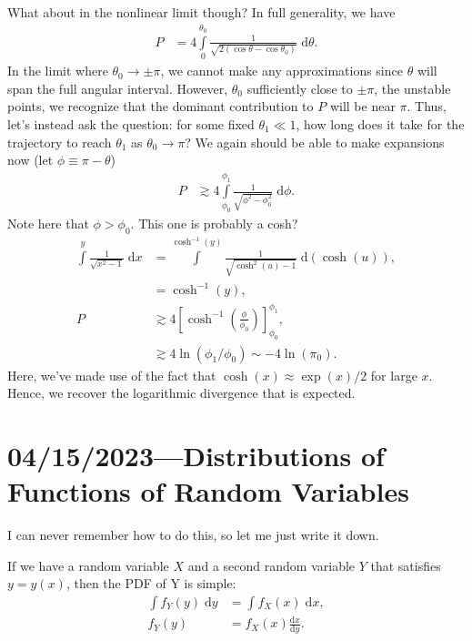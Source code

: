 \documentclass[12pt]{article}
\newcommand*{\rd}[2]{\frac{\mathrm{d}#1}{\mathrm{d}#2}}
\newcommand*{\p}[1]{\left(#1\right)}
\newcommand*{\s}[1]{\left[#1\right]}
\begin{document}
What about in the nonlinear limit though? In full generality, we have
\begin{align*}
    P &= 4\int\limits_0^{\theta_0}
        \frac{1}{\sqrt{2\p{\cos \theta - \cos \theta_0}}} \;\mathrm{d}\theta.
\end{align*}
In the limit where $\theta_0 \to \pm \pi$, we cannot make any approximations
since $\theta$ will span the full angular interval. However, $\theta_0$
sufficiently close to $\pm \pi$, the unstable points, we recognize that the
dominant contribution to $P$ will be near $\pi$. Thus, let's instead ask the
question: for some fixed $\theta_1 \ll 1$, how long does it take for the
trajectory to reach $\theta_1$ as $\theta_0 \to \pi$? We again should be able to
make expansions now (let $\phi \equiv \pi - \theta$)
\begin{align*}
    P &\gtrsim 4\int\limits_{\phi_0}^{\phi_1}
        \frac{1}{\sqrt{\phi^2 - \phi_0^2}} \;\mathrm{d}\phi.
\end{align*}
Note here that $\phi > \phi_0$. This one is probably a cosh?
\begin{align*}
    \int\limits^y\frac{1}{\sqrt{x^2 - 1}}\;\mathrm{d}x
        &= \int\limits^{\cosh^{-1}(y)}
            \frac{1}{\sqrt{\cosh^2(u) - 1}}\;\mathrm{d}(\cosh(u)),\\
        &= \cosh^{-1}(y),\\
    P &\gtrsim 4\s{\cosh^{-1}\p{\frac{\phi}{\phi_0}}}^{\phi_1}_{\phi_0},\\
        &\gtrsim 4\ln\p{\phi_1 / \phi_0} \sim -4\ln\p{\pi_0}.
\end{align*}
Here, we've made use of the fact that $\cosh(x) \approx \exp(x) / 2$ for large
$x$. Hence, we recover the logarithmic divergence that is expected.

\section{04/15/2023---Distributions of Functions of Random Variables}

I can never remember how to do this, so let me just write it down.

If we have a random variable $X$ and a second random variable $Y$ that satisfies
$y = y(x)$, then the PDF of Y is simple:
\begin{align}
    \int\limits f_Y(y)\;\mathrm{d}y
        &= \int\limits f_X(x)\;\mathrm{d}x,\\
    f_Y(y) &= f_X(x)\rd{x}{y}.
\end{align}
\end{document}
